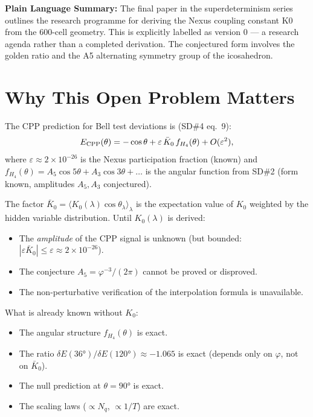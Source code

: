 \documentclass[11pt,letterpaper]{article}
\newcommand{\phig}{\varphi}
\newcommand{\eps}{\varepsilon}
\begin{document}
\bigskip\noindent
\textbf{Plain Language Summary:}
The final paper in the superdeterminism series outlines the research programme for deriving the Nexus coupling constant K0 from the 600-cell geometry. This is explicitly labelled as version 0 --- a research agenda rather than a completed derivation. The conjectured form involves the golden ratio and the A5 alternating symmetry group of the icosahedron.

\bigskip
\raggedright


\tableofcontents
\newpage

\section{Why This Open Problem Matters}

The CPP prediction for Bell test deviations is (SD\#4 eq.~9):
\begin{equation}
E_{\rm CPP}(\theta) = -\cos\theta
+ \eps\,\bar{K}_0\,f_{H_4}(\theta) + O(\eps^2),
\label{eq:E_CPP}
\end{equation}
where $\eps \approx 2\times10^{-26}$ is the Nexus participation
fraction (known) and $f_{H_4}(\theta) = A_5\cos5\theta +
A_3\cos3\theta + \ldots$ is the angular function from SD\#2 (form
known, amplitudes $A_5, A_3$ conjectured).

The factor $\bar{K}_0 = \langle K_0(\lambda)\cos\theta_\lambda
\rangle_\lambda$ is the expectation value of $K_0$ weighted by the
hidden variable distribution.  Until $K_0(\lambda)$ is derived:

\begin{itemize}
\item The \emph{amplitude} of the CPP signal is unknown (but bounded:
  $|\eps\bar K_0| \leq \eps \approx 2\times10^{-26}$).
\item The conjecture $A_5 = \phig^{-3}/(2\pi)$ cannot be proved
  or disproved.
\item The non-perturbative verification of the interpolation formula
  is unavailable.
\end{itemize}

What is already known without $K_0$:
\begin{itemize}
\item The angular structure $f_{H_4}(\theta)$ is exact.
\item The ratio $\delta E(36°)/\delta E(120°) \approx -1.065$
  is exact (depends only on $\phig$, not on $\bar K_0$).
\item The null prediction at $\theta = 90°$ is exact.
\item The scaling laws ($\propto N_q$, $\propto 1/T$) are exact.
\end{itemize}
\end{document}
